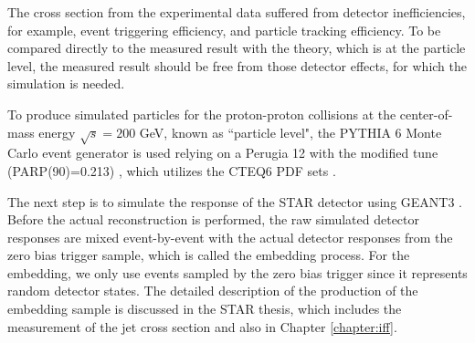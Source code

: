 The cross section from the experimental data suffered from detector inefficiencies, for example, event triggering efficiency, and particle tracking efficiency. To be compared directly to the measured result with the theory, which is at the particle level, the measured result should be free from those detector effects, for which the simulation is needed.  

To produce simulated particles for the proton-proton collisions at the center-of-mass energy $\sqrt{s}=200$ GeV, known as ``particle level", the PYTHIA 6 Monte Carlo event generator \cite{Sjostrand:2006za} is used relying on a Perugia 12 \cite{Skands:2010ak} with the modified tune (PARP(90)=0.213) \cite{Adkins:2015ccl}, which utilizes the CTEQ6 PDF sets \cite{Pumplin:2002vw}.

The next step is to simulate the response of the STAR detector using GEANT3 \cite{Brun:1987ma}. Before the actual reconstruction is performed, the raw simulated detector responses are mixed event-by-event with the actual detector responses from the zero bias trigger sample, which is called the embedding process. For the embedding, we only use events sampled by the zero bias trigger since it represents random detector states.
The detailed description of the production of the embedding sample is discussed in the STAR thesis, which includes the measurement of the jet cross section \cite{DmitriThesis2021} and also in Chapter \ref{chapter:iff}.

